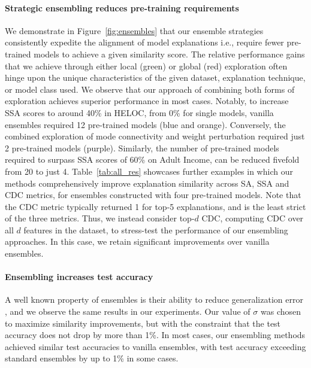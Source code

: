 \paragraph{Strategic ensembling reduces pre-training requirements} We demonstrate in Figure~\ref{fig:ensembles} that our ensemble strategies consistently expedite the alignment of model explanations i.e., require fewer pre-trained models to achieve a given similarity score. The relative performance gains that we achieve through either local (green) or global (red) exploration often hinge upon the unique
characteristics of the given dataset, explanation technique, or model class used. We observe that our approach of combining both forms of exploration achieves superior performance in most cases. Notably, to increase SSA scores to around 40\% in HELOC, from 0\% for single models, vanilla ensembles required 12 pre-trained models (blue and orange). Conversely, the combined exploration of mode connectivity and weight perturbation required just 2 pre-trained models (purple). Similarly, the number of pre-trained models required to surpass SSA scores of 60\% on Adult Income, can be reduced fivefold from 20 to just 4. Table~\ref{tab:all_res} showcases further examples in which our methods comprehensively improve explanation similarity across SA, SSA and CDC metrics, for ensembles constructed with four pre-trained models. Note that the CDC metric typically returned 1 for top-5 explanations, and is the least strict of the three metrics. Thus, we instead consider top-$d$ CDC, computing CDC over all $d$ features in the dataset, to stress-test the performance of our ensembling approaches. In this case, we retain significant improvements over vanilla ensembles.


\paragraph{Ensembling increases test accuracy} A well known property of ensembles is their ability to reduce generalization error \citep{dietterich2000, allenzhu2023}, and we observe the same results in our experiments. Our value of $\sigma$ was chosen to maximize similarity improvements, but with the constraint that the test accuracy does not drop by more than 1\%. In most cases, our ensembling methods achieved similar test accuracies to vanilla ensembles, with test accuracy exceeding standard ensembles by up to 1\% in some cases.

